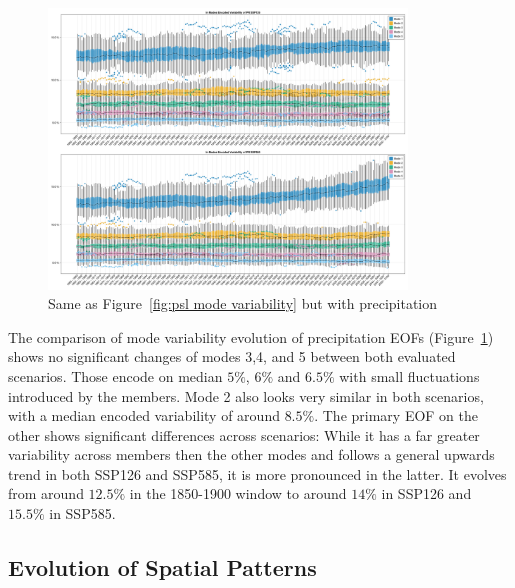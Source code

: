 \begin{figure}[htb]
  \begin{center}
    \includegraphics[width=0.85\textwidth]{figures/mode_variability_pr_50seasons.png}
  \end{center}
  \caption{Same as Figure~\ref{fig:psl mode variability} but with precipitation}\label{fig:pr mode variability}
\end{figure}

The comparison of mode variability evolution of precipitation EOFs (Figure~\ref{fig:pr mode variability}) shows no significant changes of modes 3,4, and 5 between both evaluated scenarios. 
Those encode on median $5\%$, $6\%$ and $6.5\%$ with small fluctuations introduced by the members. 
Mode 2 also looks very similar in both scenarios, with a median encoded variability of around $8.5\%$. 
The primary EOF on the other shows significant differences across scenarios: While it has a far greater variability across members then the other modes and follows a general upwards trend in both SSP126 and SSP585, it is more pronounced in the latter. 
It evolves from around $12.5\%$ in the 1850-1900 window to around $14\%$ in SSP126 and $15.5\%$ in SSP585.  


\subsection{Evolution of Spatial Patterns}

